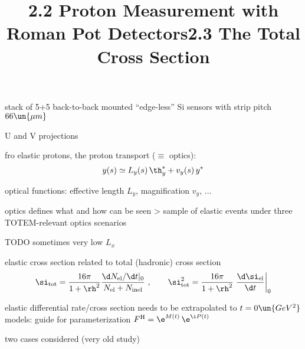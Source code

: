 
\> stack of 5+5 back-to-back mounted ``edge-less'' Si sensors with strip pitch $66\un{\mu m}$

\> U and V projections


\newpage%
\title{2.2 Proton Measurement with Roman Pot Detectors}


\> fro elastic protons, the proton transport ($\equiv$ optics):
$$y(s) \simeq L_y(s)\, \th_y^* + v_y(s)\, y^*$$

\> optical functions: effective length $L_y$, magnification $v_y$, ...

\> optics defines what and how can be seen
\>> sample of elastic events under three TOTEM-relevant optics scenarios


\> TODO sometimes very low $L_x$


\newpage%
\title{2.3 The Total Cross Section}




\> elastic cross section related to total (hadronic) cross section
$$
	\si_{\rm tot} = {16\pi\over 1+\rh^2} {\d N_{\rm el}/\d t |_0 \over N_{\rm el} + N_{\rm inel}}\ ,\qquad
	\si_{\rm tot}^2 = {16\pi\over 1+\rh^2} \left. {\d\si_{\rm el}\over\d t} \right|_0
$$

\> elastic differential rate/cross section needs to be extrapolated to $t=0\un{GeV^2}$
\> models: guide for parameterization $F^{\rm H} = \e^{M(t)}\, \e^{\i P(t)}$

\> two cases considered (very old study)



